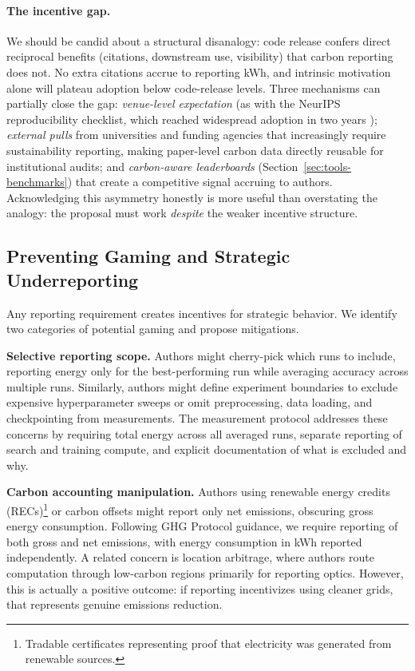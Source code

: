 \documentclass{article}
\theoremstyle{plain}
\theoremstyle{definition}
\theoremstyle{remark}
\begin{document}
\paragraph{The incentive gap.} We should be candid about a structural disanalogy: code release confers direct reciprocal benefits (citations, downstream use, visibility) that carbon reporting does not. No extra citations accrue to reporting kWh, and intrinsic motivation alone will plateau adoption below code-release levels. Three mechanisms can partially close the gap: \emph{venue-level expectation} (as with the NeurIPS reproducibility checklist, which reached widespread adoption in two years \cite{pineau2021improving}); \emph{external pulls} from universities and funding agencies that increasingly require sustainability reporting, making paper-level carbon data directly reusable for institutional audits; and \emph{carbon-aware leaderboards} (Section~\ref{sec:tools-benchmarks}) that create a competitive signal accruing to authors. Acknowledging this asymmetry honestly is more useful than overstating the analogy: the proposal must work \emph{despite} the weaker incentive structure.

\subsection{Preventing Gaming and Strategic Underreporting}

Any reporting requirement creates incentives for strategic behavior. We identify two categories of potential gaming and propose mitigations.

\textbf{Selective reporting scope.} Authors might cherry-pick which runs to include, reporting energy only for the best-performing run while averaging accuracy across multiple runs. Similarly, authors might define experiment boundaries to exclude expensive hyperparameter sweeps or omit preprocessing, data loading, and checkpointing from measurements. The measurement protocol addresses these concerns by requiring total energy across all averaged runs, separate reporting of search and training compute, and explicit documentation of what is excluded and why.

\textbf{Carbon accounting manipulation.} Authors using renewable energy credits (RECs)\footnote{Tradable certificates representing proof that electricity was generated from renewable sources.} or carbon offsets might report only net emissions, obscuring gross energy consumption. Following GHG Protocol guidance, we require reporting of both gross and net emissions, with energy consumption in kWh reported independently. A related concern is location arbitrage, where authors route computation through low-carbon regions primarily for reporting optics. However, this is actually a positive outcome: if reporting incentivizes using cleaner grids, that represents genuine emissions reduction.
\end{document}
